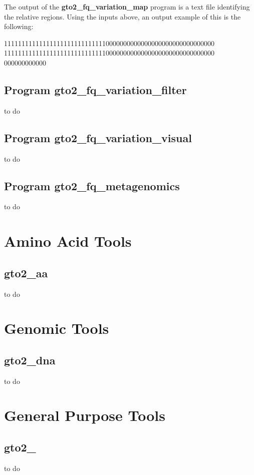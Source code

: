 \documentclass[11pt,]{krantz}
\newenvironment{Shaded}{\begin{snugshade}}{\end{snugshade}}
\newcommand{\ExtensionTok}[1]{#1}
\begin{document}
The output of the \textbf{gto2\_fq\_variation\_map} program is a text
file identifying the relative regions. Using the inputs above, an output
example of this is the following:

\begin{Shaded}
\begin{Highlighting}[]
\ExtensionTok{111111111111111111111111111110000000000000000000000000000000}
\ExtensionTok{111111111111111111111111111110000000000000000000000000000000}
\ExtensionTok{000000000000}
\end{Highlighting}
\end{Shaded}

\section{Program
gto2\_fq\_variation\_filter}\label{program-gto2_fq_variation_filter}

to do

\section{Program
gto2\_fq\_variation\_visual}\label{program-gto2_fq_variation_visual}

to do

\section{Program
gto2\_fq\_metagenomics}\label{program-gto2_fq_metagenomics}

to do

\chapter{Amino Acid Tools}\label{amino-acid-tools}

\section{gto2\_aa}\label{gto2_aa}

to do

\chapter{Genomic Tools}\label{genomic-tools}

\section{gto2\_dna}\label{gto2_dna}

to do

\chapter{General Purpose Tools}\label{general-purpose-tools}

\section{gto2\_}\label{gto2_}

to do



\printindex
\end{document}
